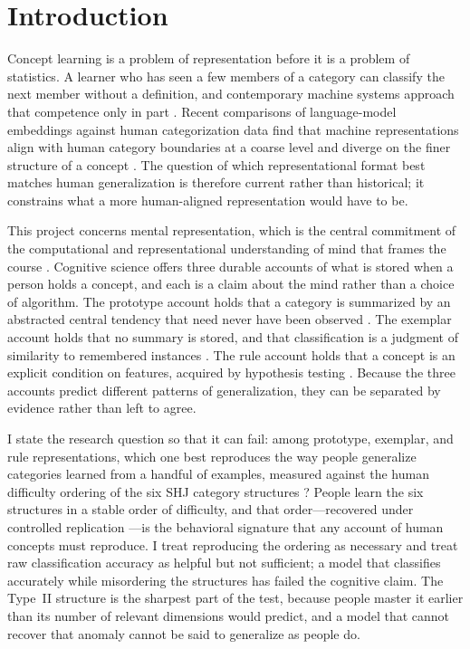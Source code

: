 \documentclass[conference]{IEEEtran}
\begin{document}
\section{Introduction}
\label{sec:intro-ref}
Concept learning is a problem of representation before it is a problem of
statistics. A learner who has seen a few members of a category can classify the
next member without a definition, and contemporary machine systems approach that
competence only in part \cite{lake2015}. Recent comparisons of language-model
embeddings against human categorization data find that machine representations
align with human category boundaries at a coarse level and diverge on the finer
structure of a concept \cite{vemuri2025}. The question of which representational
format best matches human generalization is therefore current rather than
historical; it constrains what a more human-aligned representation would have to
be.

This project concerns mental representation, which is the central commitment of
the computational and representational understanding of mind that frames the
course \cite{thagard2005,goel2026}. Cognitive science offers three durable accounts of
what is stored when a person holds a concept, and each is a claim about the mind
rather than a choice of algorithm. The prototype account holds that a category
is summarized by an abstracted central tendency that need never have been
observed \cite{rosch1975,posner1968}. The exemplar account holds that no summary
is stored, and that classification is a judgment of similarity to remembered
instances \cite{medin1978,nosofsky1986}. The rule account holds that a concept
is an explicit condition on features, acquired by hypothesis testing
\cite{bruner1956}. Because the three accounts predict different patterns of
generalization, they can be separated by evidence rather than left to agree.

I state the research question so that it can fail: among prototype, exemplar, and
rule representations, which one best reproduces the way people generalize
categories learned from a handful of examples, measured against the human
difficulty ordering of the six SHJ category structures \cite{shepard1961}?
People learn the six structures in a stable order of difficulty, and that
order---recovered under controlled replication \cite{nosofsky1994}---is the
behavioral signature that any account of human concepts must reproduce. I treat
reproducing the ordering as necessary and treat raw classification accuracy as
helpful but not sufficient; a model that classifies accurately while misordering
the structures has failed the cognitive claim. The Type~II structure is the
sharpest part of the test, because people master it earlier than its number of
relevant dimensions would predict, and a model that cannot recover that anomaly
cannot be said to generalize as people do.
\end{document}
